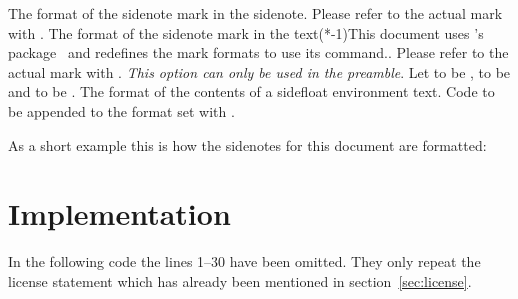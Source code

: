 \documentclass[load-preamble+]{cnltx-doc}
\begin{document}
\begin{options}
    The format of the sidenote mark in the sidenote.  Please refer to the
    actual mark with .
    The format of the sidenote mark in the text\sidenote(*-1){This document
      uses \tennent's  package~\cite{pkg:libertine} and
      redefines the mark formats to use its  command.}.  Please
    refer to the actual mark with .
    \emph{This option can only be used in the preamble}. Let  to be ,
     to be  and  to be
    .
    The format of the contents of a sidefloat environment
    text.
    Code to be appended to the format set with
    .
\end{options}

\clearpage
As a short example this is how the sidenotes for this document are formatted:
\begin{sourcecode}
\end{sourcecode}


\section{Implementation}
In the following code the lines 1--30 have been omitted. They only repeat the
license statement which has already been mentioned in section~\ref{sec:license}.


 
\end{document}
